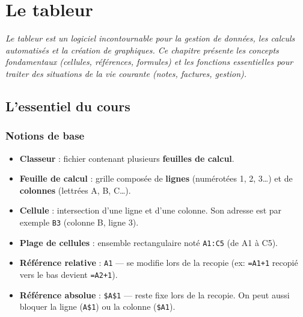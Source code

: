 \chapter{Le tableur}

\textit{Le tableur est un logiciel incontournable pour la gestion de données, les calculs automatisés et la création de graphiques. Ce chapitre présente les concepts fondamentaux (cellules, références, formules) et les fonctions essentielles pour traiter des situations de la vie courante (notes, factures, gestion).}

\section{L'essentiel du cours}

\subsection{Notions de base}
\begin{itemize}
    \item \textbf{Classeur} : fichier contenant plusieurs \textbf{feuilles de calcul}.
    \item \textbf{Feuille de calcul} : grille composée de \textbf{lignes} (numérotées 1, 2, 3\ldots) et de \textbf{colonnes} (lettrées A, B, C\ldots).
    \item \textbf{Cellule} : intersection d'une ligne et d'une colonne. Son adresse est par exemple \texttt{B3} (colonne B, ligne 3).
    \item \textbf{Plage de cellules} : ensemble rectangulaire noté \texttt{A1:C5} (de A1 à C5).
\end{itemize}

\begin{definition}[Références]
    \begin{itemize}
        \item \textbf{Référence relative} : \texttt{A1} — se modifie lors de la recopie (ex: \texttt{=A1+1} recopié vers le bas devient \texttt{=A2+1}).
        \item \textbf{Référence absolue} : \texttt{\$A\$1} — reste fixe lors de la recopie. On peut aussi bloquer la ligne (\texttt{A\$1}) ou la colonne (\texttt{\$A1}).
    \end{itemize}
\end{definition}


